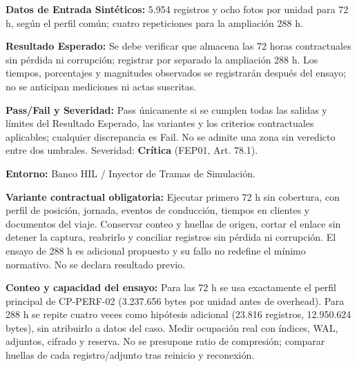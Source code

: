 \par\noindent\textbf{Datos de Entrada Sintéticos:} 5.954 registros y ocho fotos por unidad para 72 h, según el perfil común; cuatro repeticiones para la ampliación 288 h.\par
\par\noindent\textbf{Resultado Esperado:} Se debe verificar que almacena las 72 horas contractuales sin pérdida ni corrupción; registrar por separado la ampliación 288 h. Los tiempos, porcentajes y magnitudes observados se registrarán después del ensayo; no se anticipan mediciones ni actas suscritas.\par
\par\noindent\textbf{Pass/Fail y Severidad:} Pass únicamente si se cumplen todas las salidas y límites del Resultado Esperado, las variantes y los criterios contractuales aplicables; cualquier discrepancia es Fail. No se admite una zona sin veredicto entre dos umbrales. Severidad: \textbf{Crítica} (FEP01, Art. 78.1).\par
\par\noindent\textbf{Entorno:} Banco HIL / Inyector de Tramas de Simulación.\par

\par\noindent\textbf{Variante contractual obligatoria:} Ejecutar primero 72 h sin cobertura, con perfil de posición, jornada, eventos de conducción, tiempos en clientes y documentos del viaje. Conservar conteo y huellas de origen, cortar el enlace sin detener la captura, reabrirlo y conciliar registros sin pérdida ni corrupción. El ensayo de 288 h es adicional propuesto y su fallo no redefine el mínimo normativo. No se declara resultado previo.\par

\par\noindent\textbf{Conteo y capacidad del ensayo:} Para las 72 h se usa exactamente el perfil principal de CP-PERF-02 (3.237.656 bytes por unidad antes de overhead). Para 288 h se repite cuatro veces como hipótesis adicional (23.816 registros, 12.950.624 bytes), sin atribuirlo a datos del caso. Medir ocupación real con índices, WAL, adjuntos, cifrado y reserva. No se presupone ratio de compresión; comparar huellas de cada registro/adjunto tras reinicio y reconexión.\par

